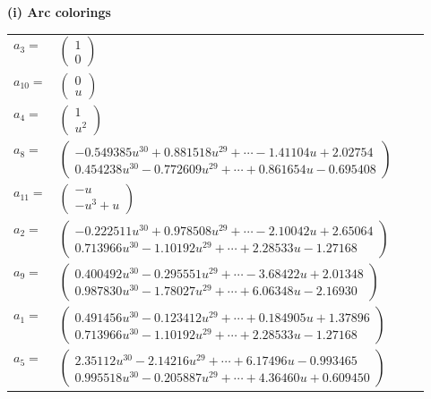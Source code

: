 \documentclass[1p]{elsarticle_modified}
\theoremstyle{definition}
\begin{document}
\flushleft \textbf{(i) Arc colorings}\\
\begin{tabular}{m{7pt} m{180pt} m{7pt} m{180pt} }
\flushright $a_{3}=$&$\begin{pmatrix}1\\0\end{pmatrix}$ \\
\flushright $a_{10}=$&$\begin{pmatrix}0\\u\end{pmatrix}$ \\
\flushright $a_{4}=$&$\begin{pmatrix}1\\u^2\end{pmatrix}$ \\
\flushright $a_{8}=$&$\begin{pmatrix}-0.549385 u^{30}+0.881518 u^{29}+\cdots-1.41104 u+2.02754\\0.454238 u^{30}-0.772609 u^{29}+\cdots+0.861654 u-0.695408\end{pmatrix}$ \\
\flushright $a_{11}=$&$\begin{pmatrix}- u\\- u^3+u\end{pmatrix}$ \\
\flushright $a_{2}=$&$\begin{pmatrix}-0.222511 u^{30}+0.978508 u^{29}+\cdots-2.10042 u+2.65064\\0.713966 u^{30}-1.10192 u^{29}+\cdots+2.28533 u-1.27168\end{pmatrix}$ \\
\flushright $a_{9}=$&$\begin{pmatrix}0.400492 u^{30}-0.295551 u^{29}+\cdots-3.68422 u+2.01348\\0.987830 u^{30}-1.78027 u^{29}+\cdots+6.06348 u-2.16930\end{pmatrix}$ \\
\flushright $a_{1}=$&$\begin{pmatrix}0.491456 u^{30}-0.123412 u^{29}+\cdots+0.184905 u+1.37896\\0.713966 u^{30}-1.10192 u^{29}+\cdots+2.28533 u-1.27168\end{pmatrix}$ \\
\flushright $a_{5}=$&$\begin{pmatrix}2.35112 u^{30}-2.14216 u^{29}+\cdots+6.17496 u-0.993465\\0.995518 u^{30}-0.205887 u^{29}+\cdots+4.36460 u+0.609450\end{pmatrix}$ \\

\end{tabular}
\end{document}

